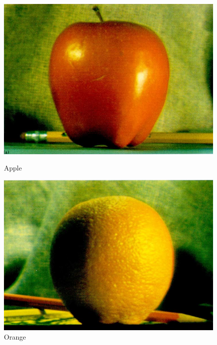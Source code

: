 \documentclass{article}
\begin{document}
    \begin{figure}[!htb]
    \begin{center}
      \includegraphics[scale=.35]{./blending/ao/apple.png}
      \caption{Apple}
    \end{center}
    \endminipage \hfill
    \begin{center}
      \includegraphics[scale=.35]{./blending/ao/orange.png}
      \caption{Orange}
     \end{center}
    \endminipage \hfill
    \end{figure}

    \phantom{}\\
\end{document}
